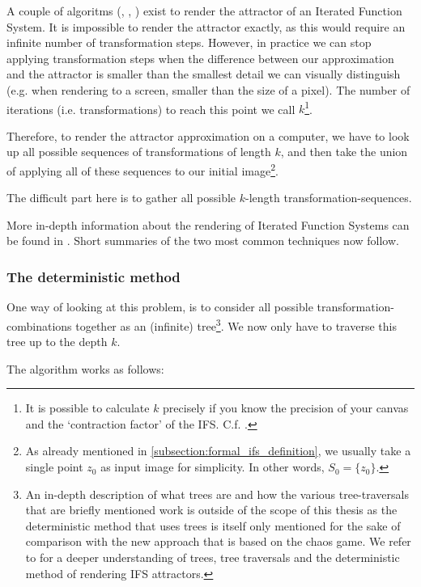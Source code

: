 \documentclass[11pt]{article}
\begin{document}
A couple of algoritms (\cite{barnsley1988fractals}, \cite{hepting1991rendering}, \cite{lawlor2012gpu}) exist to render the attractor of an Iterated Function System. 
It is impossible to render the attractor exactly, as this would require an infinite number of transformation steps.
However, in practice we can stop applying transformation steps when the difference between our approximation and the attractor is smaller than
the smallest detail we can visually distinguish (e.g. when rendering to a screen, smaller than the size of a pixel).
The number of iterations (i.e. transformations) to reach this point we call \(k\)\footnote{It is possible to calculate \(k\) precisely if you know the precision of your canvas and the `contraction factor' of the IFS. C.f. \cite{barnsley1988fractals}.}.

Therefore, to render the attractor approximation on a computer, 
we have to look up all possible sequences of transformations of length \(k\),
and then take the union of applying all of these sequences to our initial image\footnote{As already mentioned in \autoref{subsection:formal_ifs_definition}, we usually take a single point \(z_0\) as input image for simplicity. In other words, \(S_0 = \{z_0\}\).}.

The difficult part here is to gather all possible \(k\)-length transformation-sequences.

More in-depth information about the rendering of Iterated Function Systems can be found in \cite{hepting1991rendering}. 
Short summaries of the two most common techniques now follow.

\subsubsection{The deterministic method}
\label{sec:orga8bb6ed}

One way of looking at this problem, is to consider all possible transformation-combinations together as an (infinite) tree\footnote{An in-depth description of what trees are and how the various tree-traversals that are briefly mentioned work is outside of the scope of this thesis as the deterministic method that uses trees is itself only mentioned for the sake of comparison with the new approach that is based on the chaos game.
We refer to \cite{hepting1991rendering} for a deeper understanding of trees, tree traversals and the deterministic method of rendering IFS attractors.}.
We now only have to traverse this tree up to the depth \(k\).

The algorithm works as follows:
\end{document}
